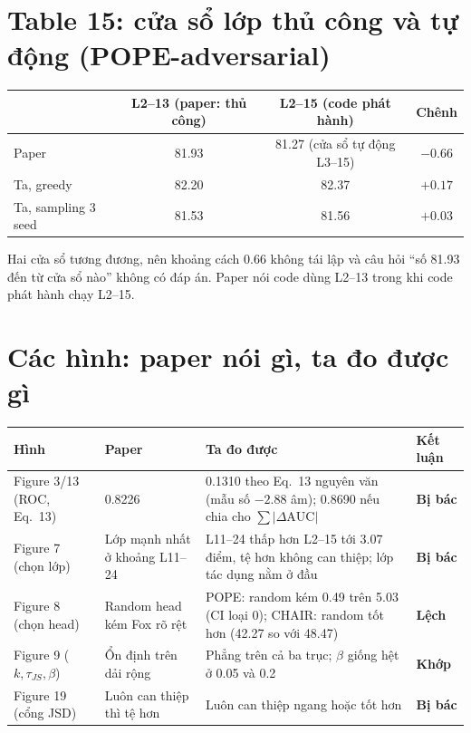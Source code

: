 \documentclass[10pt,a4paper]{article}
\newcommand{\ok}[1]{\textcolor{okc}{\textbf{#1}}}
\newcommand{\bad}[1]{\textcolor{badc}{\textbf{#1}}}
\newcommand{\warn}[1]{\textcolor{warnc}{\textbf{#1}}}
\begin{document}
\section{Table 15: cửa sổ lớp thủ công và tự động (POPE-adversarial)}
\begin{center}\small
\begin{tabular}{@{}lccc@{}}
\toprule
& L2--13 (paper: thủ công) & L2--15 (code phát hành) & Chênh \\
\midrule
Paper & 81.93 & 81.27 (cửa sổ tự động L3--15) & $-0.66$ \\
Ta, greedy & 82.20 & 82.37 & $+0.17$ \\
Ta, sampling 3 seed & 81.53 & 81.56 & $+0.03$ \\
\bottomrule
\end{tabular}
\end{center}
\noindent\small Hai cửa sổ tương đương, nên khoảng cách 0.66 không tái lập và câu hỏi ``số 81.93 đến từ cửa sổ nào'' không có đáp án. Paper nói code dùng L2--13 trong khi code phát hành chạy L2--15.

\section{Các hình: paper nói gì, ta đo được gì}
\begin{center}\small
\begin{tabular}{@{}l L{4.6cm} L{6.6cm} l@{}}
\toprule
Hình & Paper & Ta đo được & Kết luận \\
\midrule
Figure 3/13 (ROC, Eq.~13) & 0.8226 & 0.1310 theo Eq.~13 nguyên văn (mẫu số $-2.88$ âm); 0.8690 nếu chia cho $\sum|\Delta\mathrm{AUC}|$ & \bad{Bị bác} \\
Figure 7 (chọn lớp) & Lớp mạnh nhất ở khoảng L11--24 & L11--24 thấp hơn L2--15 tới 3.07 điểm, tệ hơn không can thiệp; lớp tác dụng nằm ở đầu & \bad{Bị bác} \\
Figure 8 (chọn head) & Random head kém Fox rõ rệt & POPE: random kém 0.49 trên 5.03 (CI loại 0); CHAIR: random tốt hơn (42.27 so với 48.47) & \warn{Lệch} \\
Figure 9 ($k,\tau_{JS},\beta$) & Ổn định trên dải rộng & Phẳng trên cả ba trục; $\beta$ giống hệt ở 0.05 và 0.2 & \ok{Khớp} \\
Figure 19 (cổng JSD) & Luôn can thiệp thì tệ hơn & Luôn can thiệp ngang hoặc tốt hơn & \bad{Bị bác} \\
\bottomrule
\end{tabular}
\end{center}
\end{document}
